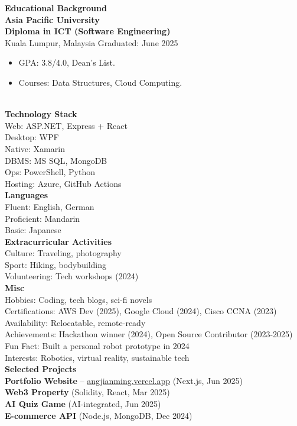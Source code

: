\documentclass[a4paper,10pt]{article}
\begin{document}
\begin{multicols}{2}
    \textbf{Educational Background} \\
    \textbf{Asia Pacific University \\ Diploma in ICT (Software Engineering)} \\
    Kuala Lumpur, Malaysia \hfill Graduated: June 2025 \\
    \begin{itemize}[leftmargin=*,nosep]
        \item GPA: 3.8/4.0, Dean’s List.
        \item Courses: Data Structures, Cloud Computing.
    \end{itemize}\\[2pt]

    \columnbreak
    \noindent
    \textbf{Technology Stack} \\
    Web: ASP.NET, Express + React \\
    Desktop: WPF \\
    Native: Xamarin \\
    DBMS: MS SQL, MongoDB \\
    Ops: PowerShell, Python \\
    Hosting: Azure, GitHub Actions \\[2pt]

    \textbf{Languages} \\
    Fluent: English, German \\
    Proficient: Mandarin \\
    Basic: Japanese \\[2pt]

    \textbf{Extracurricular Activities} \\
    Culture: Traveling, photography \\
    Sport: Hiking, bodybuilding \\
    Volunteering: Tech workshops (2024) \\[2pt]

    \textbf{Misc} \\
    Hobbies: Coding, tech blogs, sci-fi novels \\
    Certifications: AWS Dev (2025), Google Cloud (2024), Cisco CCNA (2023) \\
    Availability: Relocatable, remote-ready \\
    Achievements: Hackathon winner (2024), Open Source Contributor (2023-2025) \\
    Fun Fact: Built a personal robot prototype in 2024 \\
    Interests: Robotics, virtual reality, sustainable tech \\[2pt]

    \textbf{Selected Projects} \\
    \textbf{Portfolio Website} -- \href{https://angjianming.vercel.app}{angjianming.vercel.app} (Next.js, Jun 2025) \\
    \textbf{Web3 Property} (Solidity, React, Mar 2025) \\
    \textbf{AI Quiz Game} (AI-integrated, Jun 2025) \\
    \textbf{E-commerce API} (Node.js, MongoDB, Dec 2024) \\
\end{multicols}
\end{document}

